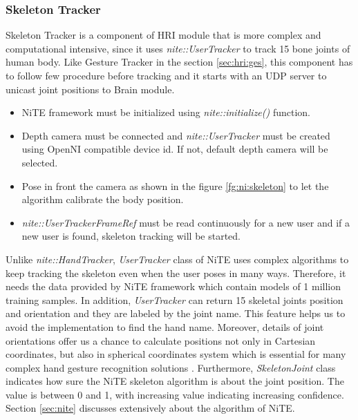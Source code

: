 \subsubsection{Skeleton Tracker} Skeleton Tracker is a component of HRI module that is more complex and computational intensive, since it uses \textit{nite::UserTracker} to track 15 bone joints of human body. Like Gesture Tracker in the section \ref{sec:hri:ges}, this component has to follow few procedure before tracking and it starts with an UDP server to unicast joint positions to Brain module. 
\begin{itemize}
	\item NiTE framework must be initialized using \textit{nite::initialize()} function. 
	\item Depth camera must be connected and \textit{nite::UserTracker} must be created using OpenNI compatible device id. If not, default depth camera will be selected. 
	\item Pose in front the camera as shown in the figure \ref{fg:ni:skeleton} to let the algorithm calibrate the body position. 
	\item \textit{nite::UserTrackerFrameRef }must be read continuously for a new user and if a new user is found, skeleton tracking will be started. 
\end{itemize}



Unlike \textit{nite::HandTracker}, \textit{UserTracker} class of NiTE uses complex algorithms to keep tracking the skeleton even when the user poses in many ways. Therefore, it needs the data provided by NiTE framework which contain models of 1 million training samples. In addition, \textit{UserTracker} can return 15 skeletal joints position and orientation and they are labeled by the joint name. This feature helps us to avoid the implementation to find the hand name. Moreover, details of joint orientations offer us a chance to calculate positions not only in Cartesian coordinates, but also in spherical coordinates system which is essential for many complex hand gesture recognition solutions \cite{21}. Furthermore, \textit{SkeletonJoint} class indicates how sure the NiTE skeleton algorithm is about the joint position. The value is between 0 and 1, with increasing value indicating increasing confidence. Section \ref{sec:nite} discusses extensively about the algorithm of NiTE.

